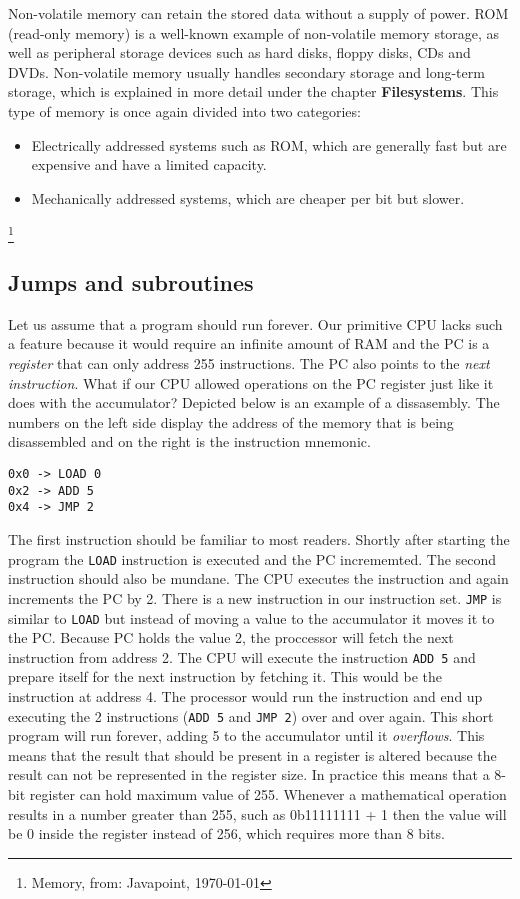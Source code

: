 Non-volatile memory can retain the stored data without a supply of power. ROM (read-only memory) is a well-known
example of non-volatile memory storage, as well as peripheral storage devices such as hard disks, floppy disks, CDs and 
DVDs. Non-volatile memory usually handles secondary storage and long-term storage, which is explained in more detail
under the chapter \textbf{Filesystems}. This type of memory is once again
divided into two categories:
\begin{itemize}
\item Electrically addressed systems such as ROM, which are generally fast but are expensive and
have a limited capacity. 
\item Mechanically addressed systems, which are cheaper per bit but slower. 
\end{itemize}

\footnote{Memory, from: Javapoint, \today}


\subsection{Jumps and subroutines}

Let us assume that a program should run forever. Our primitive CPU lacks such a feature because it
would require an infinite amount of RAM and the PC is a \textit{register} that can only address 255 
instructions. The PC also points to the \textit{next instruction}. What if our CPU allowed operations on
the PC register just like it does with the accumulator? Depicted below is an example of a 
dissasembly. The numbers on the left side display the address of the memory that is being
disassembled and on the right is the instruction mnemonic.
\begin{lstlisting}
0x0 -> LOAD 0
0x2 -> ADD 5
0x4 -> JMP 2
\end{lstlisting}
The first instruction should be familiar to most readers. Shortly after starting the program the 
\texttt{LOAD} instruction is executed and the PC incrememted. The second instruction should also be mundane.
The CPU executes the instruction and again increments the PC by 2. There is a new instruction in our 
instruction set. \texttt{JMP} is similar to \texttt{LOAD} but instead of
moving a value to the accumulator it moves it to the PC. Because PC holds the value 2, the
proccessor will fetch the next instruction from address 2. The CPU will execute the instruction
\texttt{ADD 5} and prepare itself for the next instruction by fetching it. This would be the instruction
at address 4. The processor would run the instruction and end up executing the 2 instructions
(\texttt{ADD 5} and \texttt{JMP 2}) over and over again. This short program will run forever, adding 5 to the
accumulator until it \textit{overflows}. This means that the result that should be present in a register
is altered because the result can not be represented in the register size. In practice this means
that a 8-bit register can hold maximum value of 255. Whenever a mathematical operation results in a 
number greater than 255, such as 0b11111111 + 1 then the value will be 0 inside the register instead
of 256, which requires more than 8 bits.

